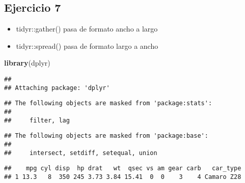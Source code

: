 \documentclass[]{book}
\newenvironment{Shaded}{\begin{snugshade}}{\end{snugshade}}
\newcommand{\DataTypeTok}[1]{\textcolor[rgb]{0.13,0.29,0.53}{#1}}
\newcommand{\KeywordTok}[1]{\textcolor[rgb]{0.13,0.29,0.53}{\textbf{#1}}}
\newcommand{\NormalTok}[1]{#1}
\newcommand{\OperatorTok}[1]{\textcolor[rgb]{0.81,0.36,0.00}{\textbf{#1}}}
\newcommand{\StringTok}[1]{\textcolor[rgb]{0.31,0.60,0.02}{#1}}
\providecommand{\tightlist}{%
  \setlength{\itemsep}{0pt}\setlength{\parskip}{0pt}}
\begin{document}
\hypertarget{ejercicio-7}{%
\subsection{Ejercicio 7}\label{ejercicio-7}}

\begin{itemize}
\tightlist
\item
  tidyr::gather() pasa de formato ancho a largo
\item
  tidyr::spread() pasa de formato largo a ancho
\end{itemize}

\begin{Shaded}
\begin{Highlighting}[]
\KeywordTok{library}\NormalTok{(dplyr)}
\end{Highlighting}
\end{Shaded}

\begin{verbatim}
## 
## Attaching package: 'dplyr'
\end{verbatim}

\begin{verbatim}
## The following objects are masked from 'package:stats':
## 
##     filter, lag
\end{verbatim}

\begin{verbatim}
## The following objects are masked from 'package:base':
## 
##     intersect, setdiff, setequal, union
\end{verbatim}

\begin{Shaded}
\end{Shaded}

\begin{verbatim}
##    mpg cyl disp  hp drat   wt  qsec vs am gear carb   car_type
## 1 13.3   8  350 245 3.73 3.84 15.41  0  0    3    4 Camaro Z28
\end{verbatim}
\end{document}
